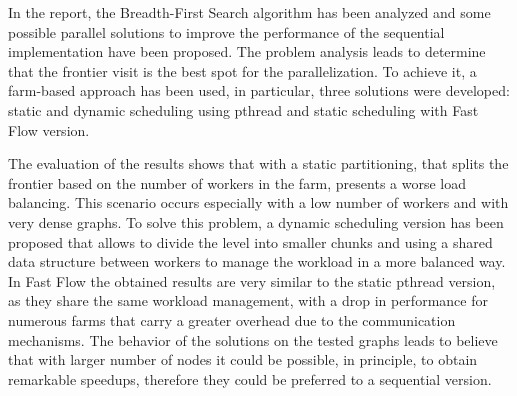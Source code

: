In the report,  the Breadth-First Search algorithm has been analyzed and some possible parallel solutions to improve the performance of the sequential implementation have been proposed.
The problem analysis leads to determine that the frontier visit is the best spot for the parallelization. To achieve it, a farm-based approach has been used, in particular, three solutions were developed: static and dynamic scheduling using pthread and static scheduling with Fast Flow version.

The evaluation of the results shows that with a static partitioning, that splits the frontier based on the number of workers in the farm, presents a worse load balancing. This scenario occurs especially with a low number of workers and with very dense graphs. 
To solve this problem, a dynamic scheduling version has been proposed that allows to divide the level into smaller chunks and using a shared data structure between workers to manage the workload in a more balanced way. 
In Fast Flow the obtained results are very similar to the static pthread version, as they share the same workload management, with a drop in performance for numerous farms that carry a greater overhead due to the communication mechanisms.
The behavior of the solutions on the tested graphs leads to believe that with larger number of nodes it could be possible, in principle, to obtain remarkable speedups, therefore they could be preferred to a sequential version.